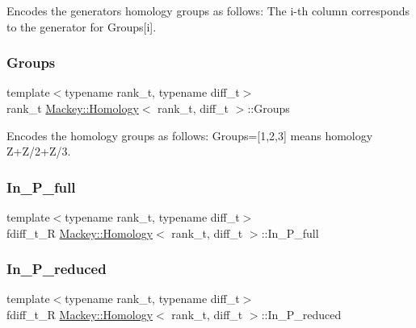 Encodes the generators homology groups as follows\+: The i-\/th column corresponds to the generator for Groups\mbox{[}i\mbox{]}. 

\mbox{\label{classMackey_1_1Homology_aaae78e6463ce6e60e7f4c5861304bc5b}} 
\subsubsection{\texorpdfstring{Groups}{Groups}}
{\footnotesize\ttfamily template$<$typename rank\+\_\+t, typename diff\+\_\+t$>$ \\
rank\+\_\+t \hyperlink{classMackey_1_1Homology}{Mackey\+::\+Homology}$<$ rank\+\_\+t, diff\+\_\+t $>$\+::Groups}



Encodes the homology groups as follows\+: Groups=\mbox{[}1,2,3\mbox{]} means homology Z+\+Z/2+\+Z/3. 

\mbox{\label{classMackey_1_1Homology_ad2f8d8e87b9ee4f6c2db72558ab8b2a8}} 
\subsubsection{\texorpdfstring{In\+\_\+\+P\+\_\+full}{In\_P\_full}}
{\footnotesize\ttfamily template$<$typename rank\+\_\+t, typename diff\+\_\+t$>$ \\
fdiff\+\_\+t\+\_\+R \hyperlink{classMackey_1_1Homology}{Mackey\+::\+Homology}$<$ rank\+\_\+t, diff\+\_\+t $>$\+::In\+\_\+\+P\+\_\+full}

\mbox{\label{classMackey_1_1Homology_ae00a8d4ac6bdfd2de79045576200c6d2}} 
\subsubsection{\texorpdfstring{In\+\_\+\+P\+\_\+reduced}{In\_P\_reduced}}
{\footnotesize\ttfamily template$<$typename rank\+\_\+t, typename diff\+\_\+t$>$ \\
fdiff\+\_\+t\+\_\+R \hyperlink{classMackey_1_1Homology}{Mackey\+::\+Homology}$<$ rank\+\_\+t, diff\+\_\+t $>$\+::In\+\_\+\+P\+\_\+reduced}

